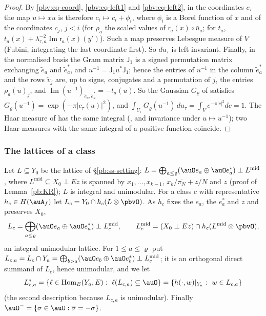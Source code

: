 \documentclass[10pt]{amsart}
\theoremstyle{definition}
\theoremstyle{remark}
\newcommand{\Iml}{\operatorname{Im}}
\providecommand{\aubar}[1]{\overline{#1}}
\begin{document}
\begin{proof}
By \eqref{pbv:eq-coord}, \eqref{pbv:eq-left1} and \eqref{pbv:eq-left2}, in the coordinates $c_\tau$ the map
$u\mapsto xu$ is therefore $c_i\mapsto c_i+\phi_i$, where $\phi_i$ is a Borel function of $x$ and of the coordinates
$c_j$, $j<i$ (for $\rho_a$ the scaled values of $\mathsf r_a(x)\circ\bar u_a$; for $t_a$, $t_a(x)+\lambda_{\tau,a}^{-2}
\Iml\mathsf r_a(x)(y')$). Such a map preserves Lebesgue measure of $V$ (Fubini, integrating the last
coordinate first). So $du_\tau$ is left invariant. Finally, in the normalised basis the Gram matrix
$\mathsf J_1$ is a signed permutation matrix exchanging $\tilde e_a$ and $\tilde e_a^*$, and $u^{-1}=\mathsf J_1
u^*\mathsf J_1$; hence the entries of $u^{-1}$ in the column $\tilde e_a^*$ and the rows $\tilde v_j$ are, up to
signs, conjugates and a permutation of $j$, the entries $\rho_a(u)_j$, and $\Iml(u^{-1})_{\tilde e_a,\tilde e_a^*}=
-t_a(u)$. So the Gaussian $G_\varrho$ of {\cite[\S4.1]{P52}} satisfies $G_\varrho(u^{-1})=\exp(-\pi|c_\tau(u)|^2)$,
and $\int_{U_\tau}G_\varrho(u^{-1})\,du_\tau=\int_Ve^{-\pi|c|^2}dc=1$. The Haar measure of {\cite[Lemma~4.1\,(c)]{P52}}
has the same integral ({\cite[Lemma~4.1\,(b)]{P52}}, and invariance under $u\mapsto u^{-1}$); two Haar measures
with the same integral of a positive function coincide.
\end{proof}

\subsubsection{The lattices of a class}\label{pbv:ss-lattices}

Let $L\subseteq Y_0$ be the lattice of \S\ref{pb:ss-setting}: $L=\bigoplus_{a\le\varrho}(\auO e_a\oplus\auO
e_a^*)\perp L^{\mathrm{mid}}$, where $L^{\mathrm{mid}}\subseteq X_0\perp Ez$ is spanned by $x_1,\dots,x_{k-1}$,
$x_k/\aubar{\pi_N}+z/N$ and $z$ (proof of Lemma~\ref{pb:KR}); $L$ is integral and unimodular. For a class
$c$ with representative $h_c\in H(\auA_f)$ let $L_c=Y_0\cap h_c(L\otimes\pbvO)$. As $h_c$ fixes the $e_a$,
the $e_a^*$ and $z$ and preserves $X_0$,
\[
L_c=\bigoplus_{a\le\varrho}(\auO e_a\oplus\auO e_a^*)\perp L_c^{\mathrm{mid}},\qquad L_c^{\mathrm{mid}}=
(X_0\perp Ez)\cap h_c(L^{\mathrm{mid}}\otimes\pbvO),
\]
an integral unimodular lattice. For $1\le a\le\varrho$ put $L_{c,a}=L_c\cap Y_a=\bigoplus_{b>a}(\auO e_b
\oplus\auO e_b^*)\perp L_c^{\mathrm{mid}}$; it is an orthogonal direct summand of $L_c$, hence unimodular,
and we let
\[
L_{c,a}^*=\{\ell\in\operatorname{Hom}_E(Y_a,E):\ \ell(L_{c,a})\subseteq\auO\}=\{h(\cdot,w)|_{Y_a}:\ w\in
L_{c,a}\}
\]
(the second description because $L_{c,a}$ is unimodular). Finally $\auO^-=\{\sigma\in\auO:\aubar\sigma=
-\sigma\}$.
\end{document}
